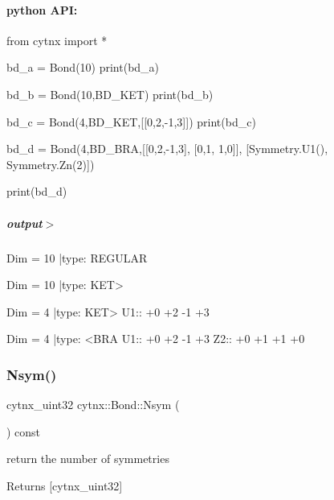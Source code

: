  \paragraph*{python A\+PI\+:}


\begin{DoxyCodeInclude}
\textcolor{keyword}{from} cytnx \textcolor{keyword}{import} *

bd\_a = Bond(10)
print(bd\_a)

bd\_b = Bond(10,BD\_KET)
print(bd\_b)

bd\_c = Bond(4,BD\_KET,[[0,2,-1,3]])
print(bd\_c)

bd\_d = Bond(4,BD\_BRA,[[0,2,-1,3],
                      [0,1, 1,0]],
                     [Symmetry.U1(),
                      Symmetry.Zn(2)])

print(bd\_d)

    
\end{DoxyCodeInclude}
 \subparagraph*{output$>$}


\begin{DoxyVerbInclude}
Dim = 10 |type: REGULAR 

Dim = 10 |type: KET>     

Dim = 4 |type: KET>     
 U1::  +0 +2 -1 +3

Dim = 4 |type: <BRA     
 U1::  +0 +2 -1 +3
 Z2::  +0 +1 +1 +0





\end{DoxyVerbInclude}
 \mbox{\label{classcytnx_1_1Bond_acd46a218add6a88c1cc9035b06adb7b6}} 
\subsubsection{\texorpdfstring{Nsym()}{Nsym()}}
{\footnotesize\ttfamily cytnx\+\_\+uint32 cytnx\+::\+Bond\+::\+Nsym (\begin{DoxyParamCaption}{ }\end{DoxyParamCaption}) const\hspace{0.3cm}{\ttfamily [inline]}}



return the number of symmetries 

\begin{DoxyReturn}{Returns}
\mbox{[}cytnx\+\_\+uint32\mbox{]} 
\end{DoxyReturn}
\mbox{\label{classcytnx_1_1Bond_ac33a7bc780a4c7afba2b6d2d571bf23e}} 
